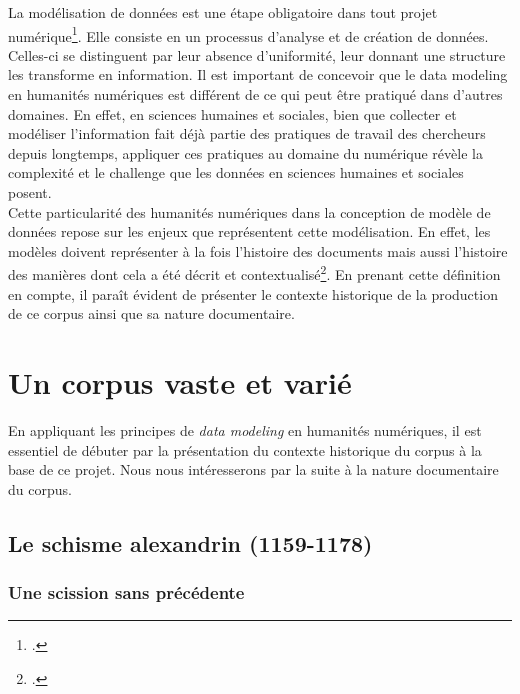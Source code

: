 La modélisation de données est une étape obligatoire dans tout projet numérique\footcite{simsion_data_2005}. Elle consiste en un processus d’analyse et de création de données. Celles-ci se distinguent par leur absence d’uniformité, leur donnant une structure les transforme en information. Il est important de concevoir que le data modeling en humanités numériques est différent de ce qui peut être pratiqué dans d’autres domaines. En effet, en sciences humaines et sociales, bien que collecter et modéliser l’information fait déjà partie des pratiques de travail des chercheurs depuis longtemps, appliquer ces pratiques au domaine du numérique révèle la complexité et le challenge que les données en sciences humaines et sociales posent.\\
Cette particularité des humanités numériques dans la conception de modèle de données repose sur les enjeux que représentent cette modélisation. En effet, les modèles doivent représenter à la fois l’histoire des documents mais aussi l’histoire des manières dont cela a été décrit et contextualisé\footcite{flanders_shape_2018}. En prenant cette définition en compte, il paraît évident de présenter le contexte historique de la production de ce corpus ainsi que sa nature documentaire. 
 
 
 \chapter{Un corpus vaste et varié}

En appliquant les principes de \textit{data modeling} en humanités numériques, il est essentiel de débuter par la présentation du contexte historique du corpus à la base de ce projet. Nous nous intéresserons par la suite à la nature documentaire du corpus.

    \section{Le schisme alexandrin (1159-1178)}
    
    \subsection{Une scission sans précédente}

